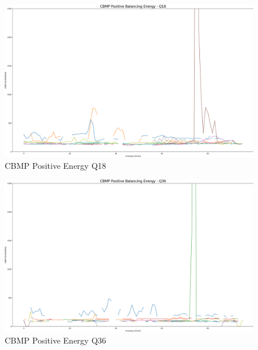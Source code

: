 \begin{figure}[H]
	\includegraphics[width=1\linewidth]{pictures/results/CBMP_PosBal_Q18.png}
	\caption{CBMP Positive Energy Q18}
	\label{fig:CBMP_PosBal_Q18}
\end{figure}
\begin{figure}[H]
	\includegraphics[width=1\linewidth]{pictures/results/CBMP_PosBal_Q36.png}
	\caption{CBMP Positive Energy Q36}
	\label{fig:CBMP_PosBal_Q36}
\end{figure}


